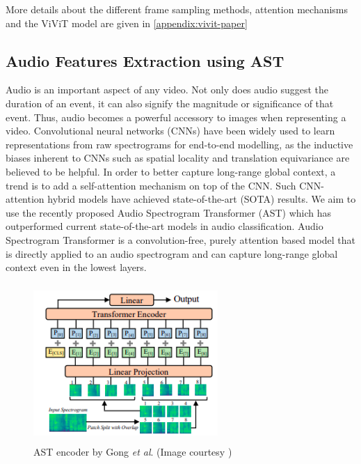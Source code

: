 \par More details about the different frame sampling methods, attention mechanisms and the ViViT model are given in \ref{appendix:vivit-paper}

\subsection{Audio Features Extraction using AST} \label{audio-feats-extraction}
\par Audio is an important aspect of any video. Not only does audio suggest the duration of an event, it can also signify the magnitude or significance of that event. Thus, audio becomes a powerful accessory to images when representing a video. Convolutional neural networks (CNNs)  have been widely used to learn representations from raw spectrograms for end-to-end modelling, as the inductive biases inherent to CNNs such as spatial locality and translation equivariance are believed to be helpful. In order to better capture long-range global context, a trend is to add a self-attention mechanism on top of the CNN. Such CNN-attention hybrid models have achieved state-of-the-art (SOTA) results. We aim to use the recently proposed Audio Spectrogram Transformer (AST) \cite{ast} which has outperformed current state-of-the-art models in audio classification. Audio Spectrogram Transformer is a convolution-free, purely attention based model that is directly applied to an audio spectrogram and can capture long-range global context even in the lowest layers.
\begin{figure} [H]
	\centering
	\includegraphics[width=7cm, height=6cm] {assets/img/ast_methodology.png}
	\caption{AST encoder by Gong \textit{et al}. (Image courtesy \cite{ast})}
\end{figure}

